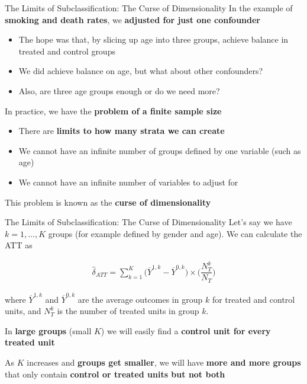 \documentclass[
  ignorenonframetext,
  aspectratio=169, handout]{beamer}
\providecommand{\tightlist}{%
  \setlength{\itemsep}{0pt}\setlength{\parskip}{0pt}}
\newcommand{\brf}[1]{\textcolor{brickred}{\textbf{#1}}}
\begin{document}
\begin{frame}{The Limits of Subclassification: The Curse of
Dimensionality}
\protect\hypertarget{the-limits-of-subclassification-the-curse-of-dimensionality}{}
In the example of \brf{smoking and death rates}, we
\brf{adjusted for just one confounder}

\begin{itemize}
\tightlist
\item
  The hope was that, by slicing up age into three groups, achieve
  balance in treated and control groups
\item
  We did achieve balance on age, but what about other confounders?
\item
  Also, are three age groups enough or do we need more?
\end{itemize}

\vfill

In practice, we have the \brf{problem of a finite sample size}

\begin{itemize}
\tightlist
\item
  There are \textbf{limits to how many strata we can create}
\item
  We cannot have an infinite number of groups defined by one variable
  (such as age)
\item
  We cannot have an infinite number of variables to adjust for
\end{itemize}

\vfill

This problem is known as the \brf{curse of dimensionality}
\end{frame}

\begin{frame}{The Limits of Subclassification: The Curse of
Dimensionality}
\protect\hypertarget{the-limits-of-subclassification-the-curse-of-dimensionality-1}{}
Let's say we have \(k=1,\dots,K\) groups (for example defined by gender
and age). We can calculate the ATT as

\begin{align*}
\widehat{\delta}_{ATT} = \sum_{k=1}^K\Big(\overline{Y}^{1,k} - \overline{Y}^{0,k}\Big)\times \bigg( \dfrac{N^k_T}{N_T} \bigg )
\end{align*}

where \(\overline{Y}^{1,k}\) and \(\overline{Y}^{0,k}\) are the average
outcomes in group \(k\) for treated and control units, and \(N^k_T\) is
the number of treated units in group \(k\).

\vfill

In \textbf{large groups} (small \(K\)) we will easily find a
\brf{control unit for every treated unit}

\vfill

As \(K\) increases and \brf{groups get smaller}, we will have
\brf{more and more groups} that only contain
\brf{control or treated units but not both}
\end{frame}
\end{document}

